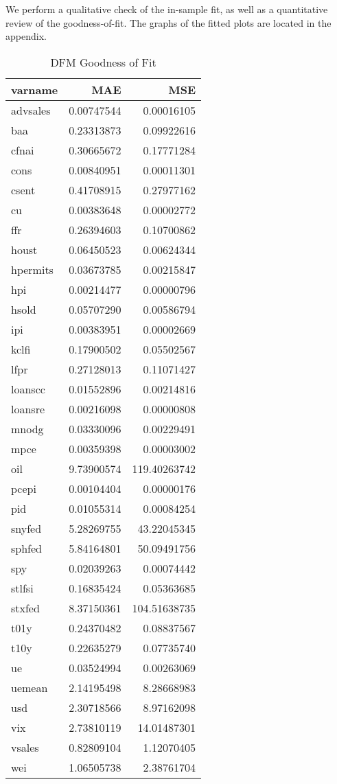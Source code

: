 \documentclass[11pt, letterpaper]{article}\usepackage[]{graphicx}\usepackage[]{color}
\begin{document}
We perform a qualitative check of the in-sample fit, as well as a quantitative review of the goodness-of-fit. The graphs of the fitted plots are located in the appendix.
\begin{table}[H]
\centering
\begingroup\footnotesize
\begin{tabular}{lrr}
  \hline
varname & MAE & MSE \\ 
  \hline
advsales & 0.00747544 & 0.00016105 \\ 
  baa & 0.23313873 & 0.09922616 \\ 
  cfnai & 0.30665672 & 0.17771284 \\ 
  cons & 0.00840951 & 0.00011301 \\ 
  csent & 0.41708915 & 0.27977162 \\ 
  cu & 0.00383648 & 0.00002772 \\ 
  ffr & 0.26394603 & 0.10700862 \\ 
  houst & 0.06450523 & 0.00624344 \\ 
  hpermits & 0.03673785 & 0.00215847 \\ 
  hpi & 0.00214477 & 0.00000796 \\ 
  hsold & 0.05707290 & 0.00586794 \\ 
  ipi & 0.00383951 & 0.00002669 \\ 
  kclfi & 0.17900502 & 0.05502567 \\ 
  lfpr & 0.27128013 & 0.11071427 \\ 
  loanscc & 0.01552896 & 0.00214816 \\ 
  loansre & 0.00216098 & 0.00000808 \\ 
  mnodg & 0.03330096 & 0.00229491 \\ 
  mpce & 0.00359398 & 0.00003002 \\ 
  oil & 9.73900574 & 119.40263742 \\ 
  pcepi & 0.00104404 & 0.00000176 \\ 
  pid & 0.01055314 & 0.00084254 \\ 
  snyfed & 5.28269755 & 43.22045345 \\ 
  sphfed & 5.84164801 & 50.09491756 \\ 
  spy & 0.02039263 & 0.00074442 \\ 
  stlfsi & 0.16835424 & 0.05363685 \\ 
  stxfed & 8.37150361 & 104.51638735 \\ 
  t01y & 0.24370482 & 0.08837567 \\ 
  t10y & 0.22635279 & 0.07735740 \\ 
  ue & 0.03524994 & 0.00263069 \\ 
  uemean & 2.14195498 & 8.28668983 \\ 
  usd & 2.30718566 & 8.97162098 \\ 
  vix & 2.73810119 & 14.01487301 \\ 
  vsales & 0.82809104 & 1.12070405 \\ 
  wei & 1.06505738 & 2.38761704 \\ 
   \hline
\end{tabular}
\endgroup
\caption{DFM Goodness of Fit} 
\end{table}
\end{document}
